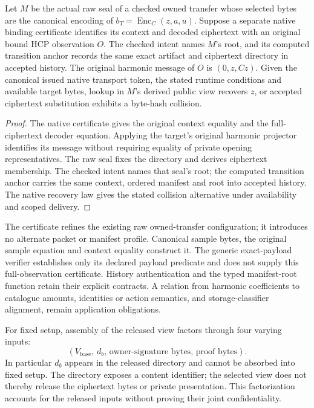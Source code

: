 \begin{proposition}
\label{prop:coupled-native-manifest}
Let \(M\) be the actual raw seal of a checked owned transfer whose selected
bytes are the canonical encoding of
\(b_T=\operatorname{Enc}_C(z,a,u)\). Suppose a separate native binding
certificate identifies its context and decoded ciphertext with an original
bound HCP observation \(O\). The checked intent names \(M\)'s root, and its
computed transition anchor records the same exact artifact and ciphertext
directory in accepted history. The original harmonic message of \(O\) is
\((0,z,Cz)\). Given the canonical issued native transport token, the stated
runtime conditions and available target bytes, lookup in \(M\)'s derived
public view recovers \(z\), or accepted ciphertext substitution exhibits a
byte-hash collision.
\end{proposition}

\begin{proof}
The native certificate gives the original context equality and the
full-ciphertext decoder equation. Applying the target's original harmonic
projector identifies its message without requiring equality of private
opening representatives. The raw seal fixes the directory and derives
ciphertext membership. The checked intent names that seal's root; the
computed transition anchor carries the same context, ordered manifest and
root into accepted history. The native recovery law gives the stated
collision alternative under availability and scoped delivery.
\end{proof}

The certificate refines the existing raw owned-transfer configuration; it
introduces no alternate packet or manifest profile. Canonical sample bytes,
the original sample equation and context equality construct it. The generic
exact-payload verifier establishes only its declared payload predicate and
does not supply this full-observation certificate. History authentication and
the typed manifest-root function retain their explicit contracts. A relation
from harmonic coefficients to catalogue amounts, identities or action
semantics, and storage-classifier alignment, remain application obligations.

For fixed setup, assembly of the released view factors through four varying
inputs:
\[
 (V_{\mathrm{base}},\,d_b,\,\text{owner-signature bytes},\,\text{proof bytes}).
\]
In particular \(d_b\) appears in the released directory and cannot be absorbed
into fixed setup. The directory exposes a content identifier; the selected
view does not thereby release the ciphertext bytes or private presentation.
This factorization accounts for the released inputs without proving their
joint confidentiality.

